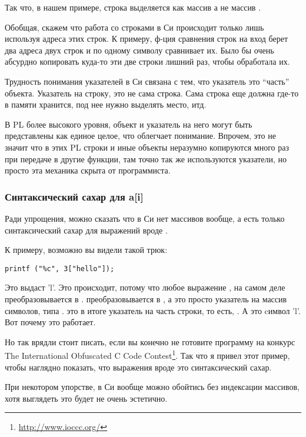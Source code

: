 Так что, в нашем примере, строка выделяется как массив  а не массив .

Обобщая, скажем что работа со строками в Си происходит только лишь используя адреса этих строк. К примеру,
ф-ция сравнения строк  на вход берет два адреса двух строк и по одному символу сравнивает их.
Было бы очень абсурдно копировать куда-то эти две строки лишний раз, чтобы  обработала их.

Трудность понимания указателей в Си связана с тем, что указатель это ``часть'' объекта. Указатель на строку,
это не сама строка. Сама строка еще должна где-то в памяти хранится, под нее нужно выделять место, итд.

В \ac{PL} более высокого уровня, объект и указатель на него могут быть представлены как единое целое, что облегчает
понимание.
Впрочем, это не значит что в этих \ac{PL} строки и иные объекты неразумно копируются много раз при передаче 
в другие функции,
там точно так же используются указатели, но просто эта механика скрыта от программиста.

\subsubsection{Синтаксический сахар для a[i]}

Ради упрощения, можно сказать что в Си нет массивов вообще, а есть только синтаксический сахар для выражений
вроде .

К примеру, возможно вы видели такой трюк:

\begin{lstlisting}
printf ("%c", 3["hello"]);
\end{lstlisting}

Это выдаст 'l'. 
Это происходит, потому что любое выражение , на самом деле преобразовывается в 
\cite[6.5.2.1]{C99TC3}.
 преобразовывается в , а  это просто указатель на массив символов, 
типа .
 это в итоге указатель на часть строки, то есть, . А  это cимвол 'l'. 
Вот почему это работает.

Но так врядли стоит писать, если вы конечно не готовите программу на конкурс 
The International Obfuscated C Code Contest\footnote{\url{http://www.ioccc.org/}}.
Так что я привел этот пример, чтобы наглядно показать, 
что выражения вроде  это синтаксический сахар.

При некотором упорстве, в Си вообще можно обойтись без индексации массивов, хотя выглядеть это будет не очень
эстетично.

